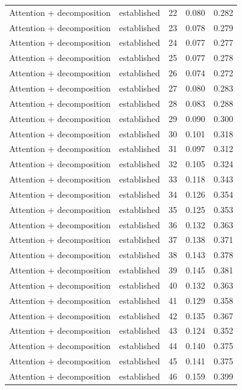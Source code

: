 \begin{tabular}{llrrr}
Attention + decomposition & established & 22 & 0.080 & 0.282 \\
Attention + decomposition & established & 23 & 0.078 & 0.279 \\
Attention + decomposition & established & 24 & 0.077 & 0.277 \\
Attention + decomposition & established & 25 & 0.077 & 0.278 \\
Attention + decomposition & established & 26 & 0.074 & 0.272 \\
Attention + decomposition & established & 27 & 0.080 & 0.283 \\
Attention + decomposition & established & 28 & 0.083 & 0.288 \\
Attention + decomposition & established & 29 & 0.090 & 0.300 \\
Attention + decomposition & established & 30 & 0.101 & 0.318 \\
Attention + decomposition & established & 31 & 0.097 & 0.312 \\
Attention + decomposition & established & 32 & 0.105 & 0.324 \\
Attention + decomposition & established & 33 & 0.118 & 0.343 \\
Attention + decomposition & established & 34 & 0.126 & 0.354 \\
Attention + decomposition & established & 35 & 0.125 & 0.353 \\
Attention + decomposition & established & 36 & 0.132 & 0.363 \\
Attention + decomposition & established & 37 & 0.138 & 0.371 \\
Attention + decomposition & established & 38 & 0.143 & 0.378 \\
Attention + decomposition & established & 39 & 0.145 & 0.381 \\
Attention + decomposition & established & 40 & 0.132 & 0.363 \\
Attention + decomposition & established & 41 & 0.129 & 0.358 \\
Attention + decomposition & established & 42 & 0.135 & 0.367 \\
Attention + decomposition & established & 43 & 0.124 & 0.352 \\
Attention + decomposition & established & 44 & 0.140 & 0.375 \\
Attention + decomposition & established & 45 & 0.141 & 0.375 \\
Attention + decomposition & established & 46 & 0.159 & 0.399 \\

\end{tabular}
